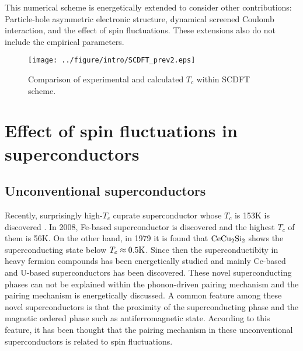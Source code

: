 This numerical scheme is energetically extended to consider other contributions:
Particle-hole asymmetric electronic structure\cite{RA2013phasy}, dynamical screened Coulomb 
interaction\cite{RA2013}, and the effect of spin fluctuations\cite{Essenberger2014}.
These extensions also do not include the empirical parameters. 

\begin{figure} %
	\centering
	\texttt{[image: ../figure/intro/SCDFT\_prev2.eps]}
	\caption{Comparison of experimental and calculated $T_c$ 
		within SCDFT scheme\cite{Marques2005, Sanna2007, Floris2005}.}
	\label{fig:scdft_compare}
\end{figure}


\section{Effect of spin fluctuations in superconductors} %
\subsection{Unconventional superconductors}
Recently, surprisingly high-$T_c$ cuprate superconductor whose $T_c$ is 153K is discovered
\cite{Bednorz1986}. In 2008, Fe-based superconductor is discovered\cite{Kamihara2008} and the highest
$T_c$ of them is 56K\cite{wang2008}. On the other hand, in 1979 it is found that $\rm CeCu_2Si_2$ 
shows the superconducting state below $T_c \approx 0.5\rm K$. Since then the superconductibity in
heavy fermion compounds has been energetically studied and mainly Ce-based and U-based superconductors
has been discovered\cite{Pfleiderer2009}.
These novel superconducting phases can not be explained within the phonon-driven pairing mechanism and
the pairing mechanism is energetically discussed\cite{Scalapino2012}.
A common feature among these novel superconductors is that the proximity of the superconducting phase
and the magnetic ordered phase such as antiferromagnetic state.
According to this feature, it has been thought that the pairing mechanism in these unconventional
superconductors is related to spin fluctuations\cite{Scalapino2012}.



